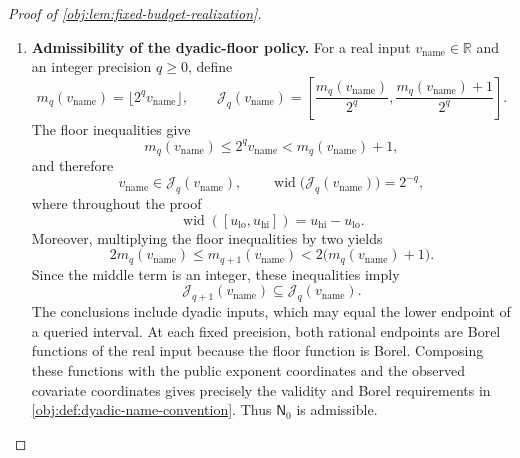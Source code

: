 \begin{proof}[Proof of \cref{obj:lem:fixed-budget-realization}]
\begin{enumerate}
\item \textbf{Admissibility of the dyadic-floor policy.}
For a real input \(v_{\mathrm{name}}\in\mathbb R\) and an integer precision \(q\ge0\), define
\[
m_q(v_{\mathrm{name}})
=\lfloor 2^qv_{\mathrm{name}}\rfloor,
\qquad
\mathcal J_q(v_{\mathrm{name}})
=
\left[
\frac{m_q(v_{\mathrm{name}})}{2^q},
\frac{m_q(v_{\mathrm{name}})+1}{2^q}
\right].
\]
The floor inequalities give
\[
m_q(v_{\mathrm{name}})
\le 2^qv_{\mathrm{name}}
<m_q(v_{\mathrm{name}})+1,
\]
and therefore
\[
v_{\mathrm{name}}\in\mathcal J_q(v_{\mathrm{name}}),
\qquad
\operatorname{wid}\bigl(\mathcal J_q(v_{\mathrm{name}})\bigr)=2^{-q},
\]
where throughout the proof
\[
\operatorname{wid}([u_{\mathrm{lo}},u_{\mathrm{hi}}])
=u_{\mathrm{hi}}-u_{\mathrm{lo}}.
\]
Moreover, multiplying the floor inequalities by two yields
\[
2m_q(v_{\mathrm{name}})
\le m_{q+1}(v_{\mathrm{name}})
<2\bigl(m_q(v_{\mathrm{name}})+1\bigr).
\]
Since the middle term is an integer, these inequalities imply
\[
\mathcal J_{q+1}(v_{\mathrm{name}})
\subseteq\mathcal J_q(v_{\mathrm{name}}).
\]
The conclusions include dyadic inputs, which may equal the lower endpoint of a queried interval. At each fixed precision, both rational endpoints are Borel functions of the real input because the floor function is Borel. Composing these functions with the public exponent coordinates and the observed covariate coordinates gives precisely the validity and Borel requirements in \cref{obj:def:dyadic-name-convention}. Thus \(\mathsf N_0\) is admissible.


\end{enumerate}
\end{proof}
